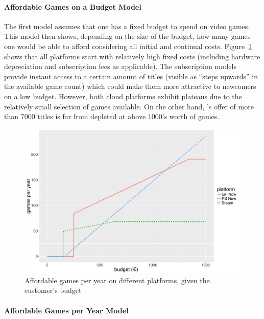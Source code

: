 \paragraph{Affordable Games on a Budget Model}

The first model assumes that one has a fixed budget to spend on video games. This model then shows, depending on the size of the budget, how many games one would be able to afford considering all initial and continual costs.
Figure~\ref{fig:gamesperyear-over-budget} shows that all platforms start with relatively high fixed costs (including hardware depreciation and subscription fees as applicable). The subscription models provide instant access to a certain amount of titles (visible as ``steps upwards'' in the available game count) which could make them more attractive to newcomers on a low budget. However, both cloud platforms exhibit plateaus due to the relatively small selection of games available. On the other hand, \steam's offer of more than $7000$ titles is far from depleted at above \SI{1000}{\EUR}'s worth of games.

\begin{figure}[!t]
	\centering
	\includegraphics[width=1.0\columnwidth]{images/gamesperyear-over-budget.pdf}
	\caption{Affordable games per year on different platforms, given the customer's budget}
\label{fig:gamesperyear-over-budget}
\end{figure}


\paragraph{Affordable Games per Year Model}


